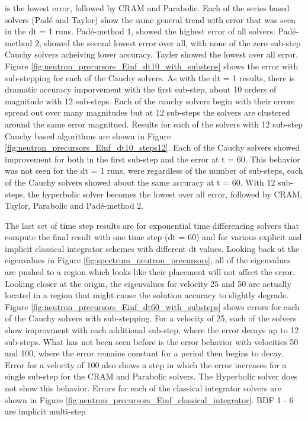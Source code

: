 \noindent is the lowest error, followed by CRAM and Parabolic. Each of the series based solvers (Pad\'e and Taylor) show the same general trend with error that was seen in the dt = 1 runs. Pad\'e-method 1, showed the highest error of all solvers. Pad\'e-method 2, showed the second lowest error over all, with none of the zero sub-step Cauchy solvers acheiving lower accuracy. Tayler showed the lowest over all error. Figure \ref{fig:neutron_precursors_Einf_dt10_with_substeps} shows the error with sub-stepping for each of the Cauchy solvers. As with the dt = 1 results, there is dramatic accuracy imporvement with the first sub-step, about 10 orders of magnitude with 12 sub-steps. Each of the cauchy solvers begin with their errors spread out over many magnitudes but at 12 sub-steps the solvers are clustered around the same error magnitued. Results for each of the solvers with 12 sub-step Cauchy based algorithms are shown in Figure \ref{fig:neutron_precursors_Einf_dt10_steps12}. Each of the Cauchy solvers showed improvement for both in the first sub-step and the error at t = 60. This behavior was not seen for the dt = 1 runs, were regardless of the number of sub-steps, each of the Cauchy solvers showed about the same accuracy at t = 60. With 12 sub-steps, the hyperbolic solver becomes the lowest over all error, followed by CRAM, Taylor, Parabolic and Pad\'e-method 2. 

The last set of time step results are for exponential time differencing solvers that compute the final result with one time step (dt = 60) and for various explicit and implicit classical integrator schemes with different dt values. Looking back at the eigenvalues in Figure \ref{fig:spectrum_neutron_precursors}, all of the eigenvalues are pushed to a region which looks like their placement will not affect the error. Looking closer at the origin, the eigenvalues for velocity 25 and 50 are actually located in a region that might cause the solution accuracy to slightly degrade. Figure \ref{fig:neutron_precursors_Einf_dt60_with_substeps} shows errors for each of the Cauchy solvers with sub-stepping. For a velocity of 25, each of the solvers show improvment with each additional sub-step, where the error decays up to 12 sub-steps. What has not been seen before is the error behavior with velocities 50 and 100, where the error remains constant for a period then begins to decay. Error for a velocity of 100 also shows a step in which the error increases for a single sub-step for the CRAM and Parabolic solvers. The Hyperbolic solver does not show this behavior. Errors for each of the classical integrator solvers are shown in Figure \ref{fig:neutron_precursors_Einf_classical_integrator}. BDF 1 - 6 are implicit multi-step 

